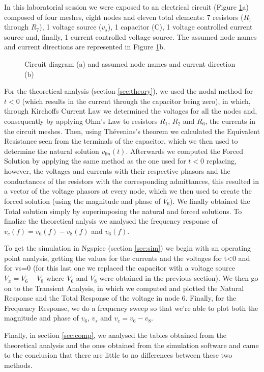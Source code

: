 \hspace{12pt} In this laboratorial session we were exposed to an electrical circuit (Figure \ref{fig:circuit}a) composed of four meshes, eight nodes and eleven total elements: 7 resistors ($R_1$ through $R_7$), 1 voltage source ($v_s$), 1 capacitor (C), 1 voltage controlled current source and, finally, 1 current controlled voltage source. The assumed node names and current directions are represented in Figure \ref{fig:circuit}b.

\begin{figure}[h]
	\centering
	\caption{Circuit diagram (a) and assumed node names and current direction (b)}
	\label{fig:circuit}
\end{figure}
 
For the theoretical analysis (section \ref{sec:theory}), we used the nodal method for $t<0$ (which results in the current through the capacitor being zero), in which, through Kirchoffs Current Law we determined the voltages for all the nodes and, consequently by applying Ohm's Law to resistors $R_1$, $R_2$ and $R_6$, the currents in the circuit meshes. Then, using Thévenins's theorem we calculated the Equivalent Resistance seen from the terminals of the capacitor, which we then used to determine the natural solution $v_{6n}(t)$. Afterwards we computed the Forced Solution by applying the same method as the one used for $t<0$ replacing, however, the voltages and currents with their respective phasors and the conductances of the resistors with the corresponding admittances, this resulted in a vector of the voltage phasors at every node, which we then used to create the forced solution (using the magnitude and phase of $\widetilde{V_6}$). We finally obtained the Total solution simply by superimposing the natural and forced solutions. To finalize the theoretical anlysis we analysed the frequency response of $v_c(f) = v_6(f) - v_8(f)$ and $v_6(f)$.

To get the simulation in Ngspice (section \ref{sec:sim}) we begin with an operating point analysis, getting the values for the currents and the voltages for t<0 and for vs=0 (for this last one we replaced the capacitor with a voltage source $V_x = V_6 - V_8$ where $V_6$ and $V_8$ were obtained in the previous section). We then go on to the Transient Analysis, in which we computed and plotted the Natural Response and the Total Response of the voltage in node 6. Finally, for the Frequency Response, we do a frequency sweep so that we're able to plot both the magnitude and phase of $v_6$, $v_s$ and $v_c = v_6 - v_8$.

Finally, in section \ref{sec:comp}, we analysed the tables obtained from the theoretical analysis and the ones obtained from the simulation software and came to the conclusion that there are little to no differences between these two methods.

\pagebreak

